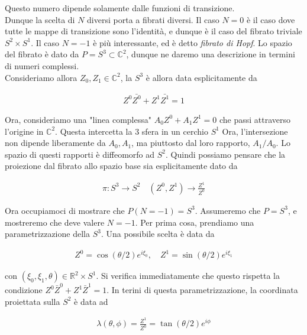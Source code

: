\documentclass{report}
\begin{document}
Questo numero dipende solamente dalle funzioni di transizione. \\

Dunque la scelta di \(N\) diversi porta a fibrati diversi. Il caso \(N=0\) è il caso dove tutte le mappe di transizione sono l'identità, e dunque è il caso del fibrato triviale \(S^2 \times S^1\). Il caso \(N=-1\) è più interessante, ed è detto \emph{fibrato di Hopf}. Lo spazio del fibrato è dato da \(P= S^3 \subset \mathbb{C}^2\), dunque ne daremo una descrizione in termini di numeri complessi. \\

Consideriamo allora \(Z_0, Z_1 \in \mathbb{C}^2\), la \(S^3\) è allora data esplicitamente da 

\begin{align}
    Z^0 \bar{Z^0} + Z^1\bar{Z^1} = 1
\end{align}

Ora, consideriamo una "linea complessa" \(A_0 Z^0 + A_1 Z^1 = 0\) che passi attraverso l'origine in \(\mathbb{C}^2\). Questa intercetta la 3 sfera in un cerchio \(S^1\) Ora, l'intersezione non dipende liberamente da \(A_0, A_1\), ma piuttosto dal loro rapporto, \(A_1/A_0\). Lo spazio di questi rapporti è diffeomorfo ad \(S^2\). Quindi possiamo pensare che la proiezione dal fibrato allo spazio base sia esplicitamente dato da 

\begin{align}
    \pi: S^3 \rightarrow S^2 \quad (Z^0, Z^1) \rightarrow \frac{Z^1}{Z^0}
\end{align}


Ora occupiamoci di mostrare che \(P(N=-1) = S^3\). Assumeremo che \(P=S^3\), e mostreremo che deve valere \(N=-1\). Per prima cosa, prendiamo una parametrizzazione della \(S^3\). Una possibile scelta è data da

\begin{align}
    Z^0 = \cos (\theta/2)e^{i\xi_0}, \quad Z^1 = \sin(\theta/2)e^{i\xi_1}
\end{align}

con \((\xi_0, \xi_1, \theta) \in \mathbb{R}^2 \times S^1\). Si verifica immediatamente che questo rispetta la condizione \(Z^0\bar{Z}^0 + Z^1 \bar{Z}^1=1\). In terini di questa parametrizzazione, la coordinata proiettata sulla \(S^2\) è data ad 


\begin{align}
    \lambda(\theta, \phi) = \frac{Z^1}{Z^0} = \tan(\theta/2)e^{i\phi}
\end{align}
\end{document}

